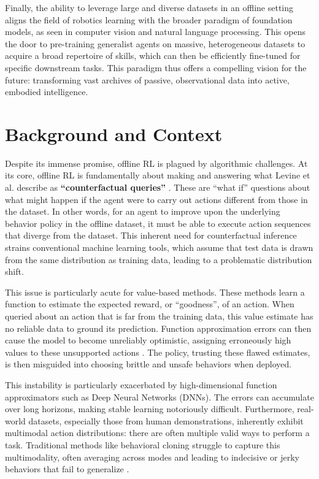 Finally, the ability to leverage large and diverse datasets in an offline setting aligns the field of robotics learning with the broader paradigm of foundation models, as seen in computer vision and natural language processing. This opens the door to pre-training generalist agents on massive, heterogeneous datasets to acquire a broad repertoire of skills, which can then be efficiently fine-tuned for specific downstream tasks. This paradigm thus offers a compelling vision for the future: transforming vast archives of passive, observational data into active, embodied intelligence.


\section{Background and Context}

Despite its immense promise, offline RL is plagued by algorithmic challenges. At its core, offline RL is fundamentally about making and answering what Levine et al. describe as \textbf{“counterfactual queries”} \cite{levineOfflineReinforcementLearning2020}. These are “what if” questions about what might happen if the agent were to carry out actions different from those in the dataset. In other words, for an agent to improve upon the underlying behavior policy in the offline dataset, it must be able to execute action sequences that diverge from the dataset. This inherent need for counterfactual inference strains conventional machine learning tools, which assume that test data is drawn from the same distribution as training data, leading to a problematic distribution shift.

This issue is particularly acute for value-based methods. These methods learn a function to estimate the expected reward, or “goodness”, of an action. When queried about an action that is far from the training data, this value estimate has no reliable data to ground its prediction. Function approximation errors can then cause the model to become unreliably optimistic, assigning erroneously high values to these unsupported actions \cite{levineOfflineReinforcementLearning2020}. The policy, trusting these flawed estimates, is then misguided into choosing brittle and unsafe behaviors when deployed.

This instability is particularly exacerbated by high-dimensional function approximators such as Deep Neural Networks (DNNs). The errors can accumulate over long horizons, making stable learning notoriously difficult. Furthermore, real-world datasets, especially those from human demonstrations, inherently exhibit multimodal action distributions: there are often multiple valid ways to perform a task. Traditional methods like behavioral cloning struggle to capture this multimodality, often averaging across modes and leading to indecisive or jerky behaviors that fail to generalize \cite{chiDiffusionPolicyVisuomotor2023}.


